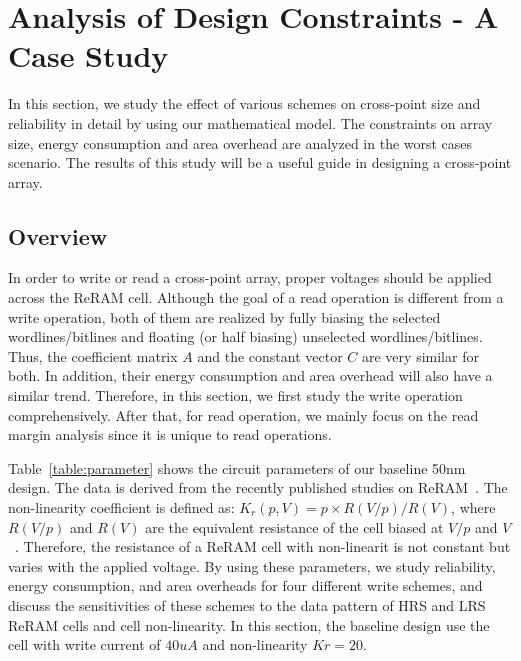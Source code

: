\vspace{-4pt}
\section{Analysis of Design Constraints - A Case Study}\label{sec:w_and_r}

In this section, we study the effect of various schemes on cross-point
size and reliability in detail by using our mathematical model. The
constraints on array size, energy consumption and area overhead are
analyzed in the worst cases scenario. The results of this study will be a
useful guide in designing a cross-point array.

\vspace{-10pt}
\subsection{Overview}
In order to write or read a cross-point array, proper voltages should be
applied across the ReRAM cell. Although the goal of a read operation is
different from a write operation, both of them are realized by fully
biasing the selected wordlines/bitlines and floating (or half biasing)
unselected wordlines/bitlines. Thus, the coefficient matrix $A$ and the
constant vector $C$ are very similar for both. In addition, their energy
consumption and area overhead will also have a similar trend. Therefore,
in this section, we first study the write operation comprehensively. After
that, for read operation, we mainly focus on the read margin analysis
since it is unique to read operations.

Table~\ref{table:parameter} shows the circuit parameters of our baseline
50nm design. The data is derived from the recently published studies on
ReRAM~\cite{ReRAM_overview,memristor:Cong,ReRAM_Renesas}. The
non-linearity coefficient is defined as: $K_r(p,V) = p \times
R(V/p)/R(V)$, where $R(V/p)$ and $R(V)$ are the equivalent resistance of
the cell biased at $V/p$ and $V$~\cite{memristor:Cong}. Therefore, the
resistance of a ReRAM cell with non-linearit is not constant but varies
with the applied voltage. By using these parameters, we study reliability,
energy consumption, and area overheads for four different write schemes,
and discuss the sensitivities of these schemes to the data pattern of HRS
and LRS ReRAM cells and cell non-linearity. In this section, the baseline
design use the cell with write current of $40 uA$ and non-linearity
$Kr=20$.

